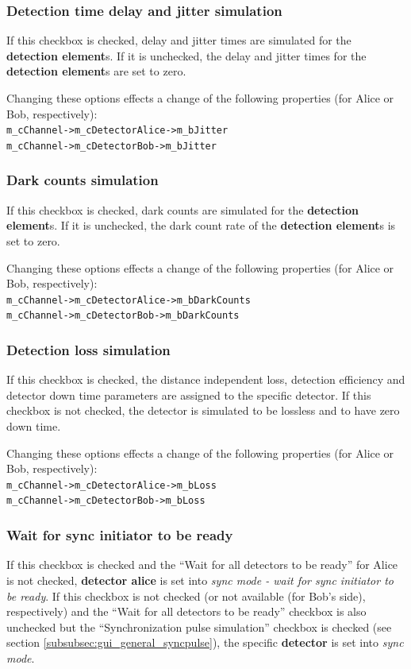 \subsubsection{Detection time delay and jitter simulation}
If this checkbox is checked, delay and jitter times are simulated for the \textbf{detection element}s. If it is unchecked, the delay and jitter times for the \textbf{detection element}s are set to zero.

Changing these options effects a change of the following properties (for Alice or Bob, respectively)\hyperlink{fn:modinfo}{\footnotemark[\value{fnmodinfo}]}:\\
\texttt{m\_cChannel->m\_cDetectorAlice->m\_bJitter}\\
\texttt{m\_cChannel->m\_cDetectorBob->m\_bJitter}

\subsubsection{Dark counts simulation}
If this checkbox is checked, dark counts are simulated for the \textbf{detection element}s. If it is unchecked, the dark count rate of the \textbf{detection element}s is set to zero.

Changing these options effects a change of the following properties (for Alice or Bob, respectively)\hyperlink{fn:modinfo}{\footnotemark[\value{fnmodinfo}]}:\\
\texttt{m\_cChannel->m\_cDetectorAlice->m\_bDarkCounts}\\
\texttt{m\_cChannel->m\_cDetectorBob->m\_bDarkCounts}

\subsubsection{Detection loss simulation}
If this checkbox is checked, the distance independent loss, detection efficiency and detector down time parameters are assigned to the specific detector. If this checkbox is not checked, the detector is simulated to be lossless and to have zero down time.

Changing these options effects a change of the following properties (for Alice or Bob, respectively)\hyperlink{fn:modinfo}{\footnotemark[\value{fnmodinfo}]}:\\
\texttt{m\_cChannel->m\_cDetectorAlice->m\_bLoss}\\
\texttt{m\_cChannel->m\_cDetectorBob->m\_bLoss}

\subsubsection{Wait for sync initiator to be ready}
\label{subsubsec:gui_abopt_wait_for_sync_initiator}
If this checkbox is checked and the ``Wait for all detectors to be ready'' for Alice is not checked, \textbf{detector alice} is set into \textit{sync mode - wait for sync initiator to be ready}. If this checkbox is not checked (or not available (for Bob's side), respectively) and the ``Wait for all detectors to be ready'' checkbox is also unchecked but the ``Synchronization pulse simulation'' checkbox is checked (see section \ref{subsubsec:gui_general_syncpulse}), the specific \textbf{detector} is set into \textit{sync mode}.

